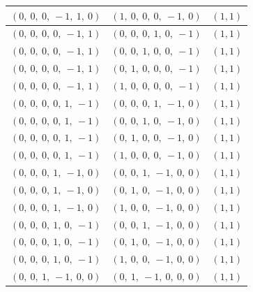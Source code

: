 \documentclass[11pt]{article}
\theoremstyle{definition}
\begin{document}
\begin{longtable}{|l|l|c|}
    \hline
    $\left( 0, \  0, \  0, \  -1, \  1, \  0\right)$ & $\left( 1, \  0, \  0, \  0, \  -1, \  0\right)$ & $(1,1)$ \\
    \hline
    $\left( 0, \  0, \  0, \  0, \  -1, \  1\right)$ & $\left( 0, \  0, \  0, \  1, \  0, \  -1\right)$ & $(1,1)$ \\
    \hline
    $\left( 0, \  0, \  0, \  0, \  -1, \  1\right)$ & $\left( 0, \  0, \  1, \  0, \  0, \  -1\right)$ & $(1,1)$ \\
    \hline
    $\left( 0, \  0, \  0, \  0, \  -1, \  1\right)$ & $\left( 0, \  1, \  0, \  0, \  0, \  -1\right)$ & $(1,1)$ \\
    \hline
    $\left( 0, \  0, \  0, \  0, \  -1, \  1\right)$ & $\left( 1, \  0, \  0, \  0, \  0, \  -1\right)$ & $(1,1)$ \\
    \hline
    $\left( 0, \  0, \  0, \  0, \  1, \  -1\right)$ & $\left( 0, \  0, \  0, \  1, \  -1, \  0\right)$ & $(1,1)$ \\
    \hline
    $\left( 0, \  0, \  0, \  0, \  1, \  -1\right)$ & $\left( 0, \  0, \  1, \  0, \  -1, \  0\right)$ & $(1,1)$ \\
    \hline
    $\left( 0, \  0, \  0, \  0, \  1, \  -1\right)$ & $\left( 0, \  1, \  0, \  0, \  -1, \  0\right)$ & $(1,1)$ \\
    \hline
    $\left( 0, \  0, \  0, \  0, \  1, \  -1\right)$ & $\left( 1, \  0, \  0, \  0, \  -1, \  0\right)$ & $(1,1)$ \\
    \hline
    $\left( 0, \  0, \  0, \  1, \  -1, \  0\right)$ & $\left( 0, \  0, \  1, \  -1, \  0, \  0\right)$ & $(1,1)$ \\
    \hline
    $\left( 0, \  0, \  0, \  1, \  -1, \  0\right)$ & $\left( 0, \  1, \  0, \  -1, \  0, \  0\right)$ & $(1,1)$ \\
    \hline
    $\left( 0, \  0, \  0, \  1, \  -1, \  0\right)$ & $\left( 1, \  0, \  0, \  -1, \  0, \  0\right)$ & $(1,1)$ \\
    \hline
    $\left( 0, \  0, \  0, \  1, \  0, \  -1\right)$ & $\left( 0, \  0, \  1, \  -1, \  0, \  0\right)$ & $(1,1)$ \\
    \hline
    $\left( 0, \  0, \  0, \  1, \  0, \  -1\right)$ & $\left( 0, \  1, \  0, \  -1, \  0, \  0\right)$ & $(1,1)$ \\
    \hline
    $\left( 0, \  0, \  0, \  1, \  0, \  -1\right)$ & $\left( 1, \  0, \  0, \  -1, \  0, \  0\right)$ & $(1,1)$ \\
    \hline
    $\left( 0, \  0, \  1, \  -1, \  0, \  0\right)$ & $\left( 0, \  1, \  -1, \  0, \  0, \  0\right)$ & $(1,1)$ \\

\end{longtable}
\end{document}
